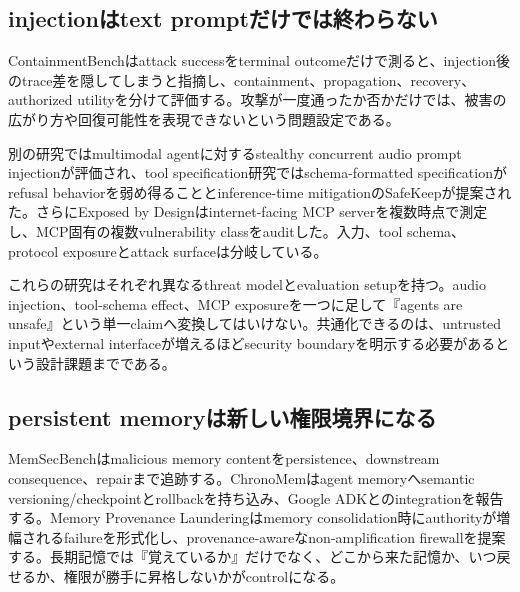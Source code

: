 \par\medskip
\subsection{injectionはtext promptだけでは終わらない}

ContainmentBenchはattack successをterminal outcomeだけで測ると、injection後のtrace差を隠してしまうと指摘し、containment、propagation、recovery、authorized utilityを分けて評価する。攻撃が一度通ったか否かだけでは、被害の広がり方や回復可能性を表現できないという問題設定である。\autocite{src-e08216aa168c}


別の研究ではmultimodal agentに対するstealthy concurrent audio prompt injectionが評価され、tool specification研究ではschema-formatted specificationがrefusal behaviorを弱め得ることとinference-time mitigationのSafeKeepが提案された。さらにExposed by Designはinternet-facing MCP serverを複数時点で測定し、MCP固有の複数vulnerability classをauditした。入力、tool schema、protocol exposureとattack surfaceは分岐している。\autocite{src-0ebd2e2bdbb7,src-62c4ed3c6c14,src-65271d0e1d0b}


\begin{claimboundary}
これらの研究はそれぞれ異なるthreat modelとevaluation setupを持つ。audio injection、tool-schema effect、MCP exposureを一つに足して『agents are unsafe』という単一claimへ変換してはいけない。共通化できるのは、untrusted inputやexternal interfaceが増えるほどsecurity boundaryを明示する必要があるという設計課題までである。\autocite{src-0ebd2e2bdbb7,src-62c4ed3c6c14,src-65271d0e1d0b,src-e08216aa168c}
\end{claimboundary}

\par\medskip
\subsection{persistent memoryは新しい権限境界になる}

MemSecBenchはmalicious memory contentをpersistence、downstream consequence、repairまで追跡する。ChronoMemはagent memoryへsemantic versioning/checkpointとrollbackを持ち込み、Google ADKとのintegrationを報告する。Memory Provenance Launderingはmemory consolidation時にauthorityが増幅されるfailureを形式化し、provenance-awareなnon-amplification firewallを提案する。長期記憶では『覚えているか』だけでなく、どこから来た記憶か、いつ戻せるか、権限が勝手に昇格しないかがcontrolになる。\autocite{src-021c5e6be64a,src-1eac9e55bab6,src-732b15b19744}


